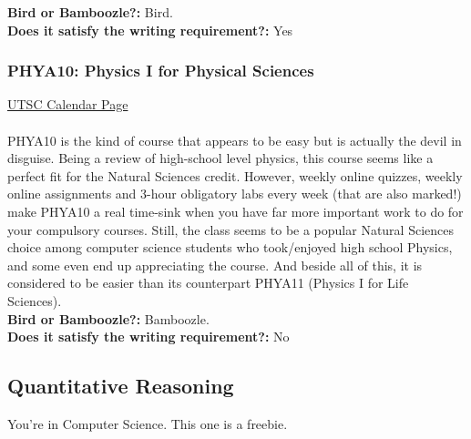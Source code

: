\documentclass[11pt]{article}
\begin{document}
\textbf{Bird or Bamboozle?:} Bird.\\

\textbf{Does it satisfy the writing requirement?:} Yes

\subsubsection{PHYA10: Physics I for Physical Sciences}
\href{https://utsc.calendar.utoronto.ca/course/PHYA10H3}{UTSC Calendar Page}\\\\
PHYA10 is the kind of course that appears to be easy but is actually the devil in disguise. Being a review of high-school level physics, this course seems like a perfect fit for the Natural Sciences credit. However, weekly online quizzes, weekly online assignments and 3-hour obligatory labs every week (that are also marked!) make PHYA10 a real time-sink when you have far more important work to do for your compulsory courses. Still, the class seems to be a popular Natural Sciences choice among computer science students who took/enjoyed high school Physics, and some even end up appreciating the course. And beside all of this, it is considered to be easier than its counterpart PHYA11 (Physics I for Life Sciences). \\

\textbf{Bird or Bamboozle?:} Bamboozle.\\

\textbf{Does it satisfy the writing requirement?:} No

\subsection{Quantitative Reasoning}
You're in Computer Science.  This one is a freebie.
\end{document}
